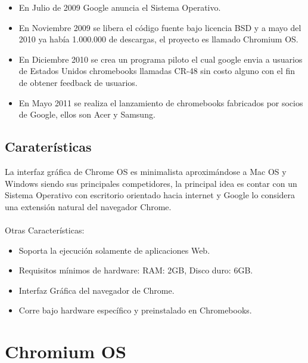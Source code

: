 \begin{itemize}
     \item En Julio de 2009 Google anuncia el Sistema Operativo.
     \item En Noviembre 2009 se libera el código fuente bajo licencia BSD y a mayo del 2010 ya hab\'ia 1.000.000 de descargas, el proyecto es llamado Chromium OS. 
     \item En Diciembre 2010 se crea un programa piloto el cual google envia a usuarios de Estados Unidos chromebooks llamadas CR-48 sin costo alguno con el fin de obtener feedback de usuarios.
     \item En Mayo 2011 se realiza el lanzamiento de chromebooks fabricados por socios de Google, ellos son Acer y Samsung.
\end{itemize}

\subsection{Carater\'isticas}

La interfaz gr\'afica de Chrome OS es minimalista aproxim\'andose a Mac OS y Windows siendo sus principales competidores, la principal idea es contar con un Sistema Operativo con escritorio orientado hacia internet y Google lo considera una extensión natural del navegador Chrome.
\\
\\
Otras Caracter\'isticas:

\begin{itemize}
     \item Soporta la ejecuci\'on solamente de aplicaciones Web.
     \item Requisitos mínimos de hardware: RAM: 2GB, Disco duro: 6GB.
     \item Interfaz Gr\'afica del navegador de Chrome.
	 \item Corre bajo hardware específico y preinstalado en Chromebooks.
\end{itemize}

\section{Chromium OS}

